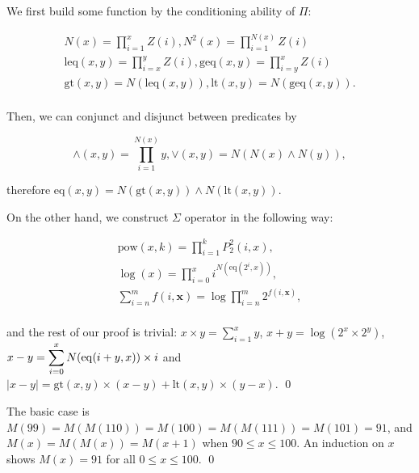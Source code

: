 \documentclass[11pt]{article}
\begin{document}
\begin{pf} \rm
  We first build some function by the conditioning ability of $\Pi$:

\[
 \begin{array}{c}
  \displaystyle N(x) = \prod_{i=1}^{x} Z(i), N^2(x) = \prod_{i=1}^{N(x)} Z(i) \\
  \displaystyle \mathrm{leq}(x, y) = \prod_{i = x}^y Z(i), 
  \displaystyle \mathrm{geq}(x, y) = \prod_{i = y}^x Z(i) \\
  \displaystyle \mathrm{gt}(x, y) = N(\mathrm{leq}(x, y)), 
  \displaystyle \mathrm{lt}(x, y) = N(\mathrm{geq}(x, y)). \\
 \end{array}
\]

  Then, we can conjunct and disjunct between predicates by

\[
  \mathrm{\land}(x, y) = \prod_{i = 1}^{N(x)} y, 
  \mathrm{\lor}(x, y) = N( N(x) \land N(y) ),
\]

\noindent therefore $\mathrm{eq}(x, y) = N(\mathrm{gt}(x, y)) \land N(\mathrm{lt}(x, y))$.

On the other hand,  we construct $\Sigma$ operator in the following way:

\[
 \begin{array}{c}
    \displaystyle \mathrm{pow}(x, k)  = \prod_{i = 1}^{k} P_2^2(i, x), \\
    \displaystyle \log (x) = \prod_{i = 0}^{x} i^{N(\mathrm{eq}(2^i, x))}, \\
    \displaystyle \sum_{i=n}^{m} f(i, \mathbf{x}) = \log \prod_{i=n}^{m} 2^{f(i, \mathbf{x})}, \\
 \end{array}
\]

\noindent and the rest of our proof is trivial:
  $\displaystyle x\times y = \sum_{i = 1}^x y$, 
  $\displaystyle x + y = \log \left( 2^{x} \times 2^y \right)$, 
  $\displaystyle x - y = \sum_{i = 0}^x N(\mathrm{eq}(i + y, x)) \times i$ and 
  $\displaystyle |x-y| = \mathrm{gt}(x, y) \times (x - y) + \mathrm{lt}(x, y) \times (y - x)$. \qed

\end{pf}


\begin{pf} \rm
The basic case is $M(99) = M(M(110)) = M(100) = M(M(111)) = M(101) = 91$, and
$M(x) = M(M(x)) = M(x + 1)$ when $90 \leq x \leq 100$.
An induction on $x$ shows $M(x)=91$ for all $0\leq x\leq 100$. \qed
\end{pf}
\end{document}

